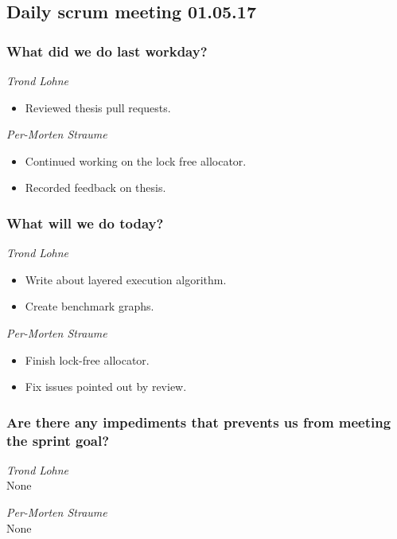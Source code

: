 \documentclass{article}
\begin{document}
\begin{center}
\subsection*{Daily scrum meeting 01.05.17}
\end{center}
\bigskip


\subsubsection*{What did we do last workday?}

\noindent\textit{Trond Lohne}
\begin{itemize}
	\item
	Reviewed thesis pull requests.
\end{itemize}

\medskip

\noindent\textit{Per-Morten Straume}
\begin{itemize}
	\item
	Continued working on the lock free allocator.

	\item
	Recorded feedback on thesis.
\end{itemize}


\subsubsection*{What will we do today?}

\noindent\textit{Trond Lohne}
\begin{itemize}
	\item
	Write about layered execution algorithm.

	\item
    Create benchmark graphs.
\end{itemize}

\medskip

\noindent\textit{Per-Morten Straume}
\begin{itemize}
	\item
	Finish lock-free allocator.

	\item
	Fix issues pointed out by review.
\end{itemize}


\subsubsection*{Are there any impediments that prevents us from meeting the sprint goal?}

\noindent\textit{Trond Lohne}\\
None

\medskip

\noindent\textit{Per-Morten Straume}\\
None
\end{document}
